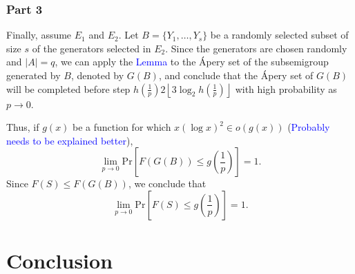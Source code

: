 \subsubsection*{Part 3}

\par Finally, assume $E_1$ and $E_2$. Let $B = \{Y_{1}, \ldots, Y_{s}\}$ be a randomly selected subset of size $s$ of the generators selected in $E_2$.  Since the generators are chosen randomly and $|A| = q$, we can apply the \textcolor{blue}{Lemma} to the Ápery set of the subsemigroup generated by $B$, denoted by $G(B)$, and conclude that the Ápery set of $G(B)$ will be completed before step $h\left(\frac{1}{p}\right)2\left\lfloor 3\log_2 h\left(\frac{1}{p}\right)\right\rfloor$ with high probability as $p \to 0$. 
\par Thus, if $g(x)$ be a function for which $x(\log x)^2 \in o(g(x))$ (\textcolor{blue}{Probably needs to be explained better}),
\[\lim_{p \to  0} \text{Pr}\left[F(G(B)) \leq g\left(\frac{1}{p}\right)\right] = 1.\]
Since $F(S) \leq F(G(B))$, we conclude that
\[\lim_{p \to 0}\text{Pr}\left[F(S) \leq g\left(\frac{1}{p}\right)\right] = 1.\] 

\section{Conclusion}
